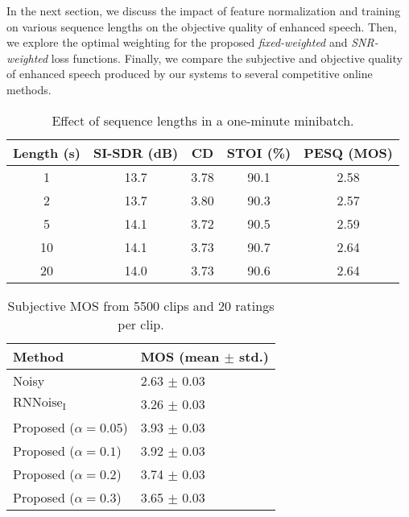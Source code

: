 \documentclass{article}
\begin{document}
In the next section, we discuss the impact of feature normalization and training on various sequence lengths on the objective quality of enhanced speech. Then, we explore the optimal weighting for the proposed \textit{fixed-weighted} and \textit{SNR-weighted} loss functions. Finally, we compare the subjective and objective quality of enhanced speech produced by our systems to several competitive online methods.
\begin{table}[tb]
  \centering
  \caption{Effect of sequence lengths in a one-minute minibatch.}
  \label{tab:seqlen}
  \begin{tabular}{c|c|c|c|c}
    Length (s) &SI-SDR (dB)&CD&STOI (\%)&PESQ (MOS)\\
    \hline
    
    1&13.7&3.78&90.1&2.58 \\
    2&13.7&3.80&90.3&2.57 \\
5&14.1&3.72&90.5&2.59 \\
10&14.1&3.73&90.7&2.64 \\
20&14.0&3.73&90.6&2.64 \\
  \end{tabular}
  \vspace{-4mm}
\end{table}
\begin{table}[tb]
  \centering
  \caption{Subjective MOS from 5500 clips and 20 ratings per clip.}
  \label{tab:sub}
  \begin{tabular}{l|l}
    Method & MOS (mean $\pm$ std.) \\
    \hline
    Noisy &2.63 $\pm$ 0.03 \\
    $\text{RNNoise}_\text{I}$ \cite{Reddy2019} &3.26 $\pm$ 0.03 \\
    Proposed ($\alpha=0.05$)&3.93 $\pm$ 0.03 \\
    Proposed ($\alpha=0.1$)&3.92 $\pm$ 0.03 \\
    Proposed ($\alpha=0.2$)&3.74 $\pm$ 0.03 \\
    Proposed ($\alpha=0.3$)&3.65 $\pm$ 0.03 \\
  \end{tabular}
\end{table}
\end{document}
